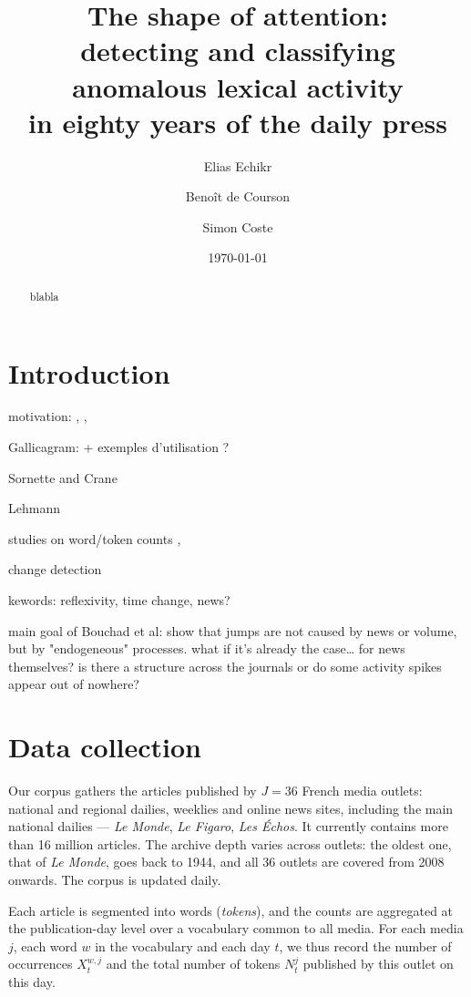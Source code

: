 \documentclass[11pt,a4paper]{article}
\title{The shape of attention:\\
detecting and classifying anomalous lexical activity\\
in eighty years of the daily press}
\author{%
  Elias Echikr \and
  Benoît de Courson \and
  Simon Coste
}
\date{\today}
\begin{document}
\maketitle

\begin{abstract}blabla
\end{abstract}

\tableofcontents

\newpage 


\section{Introduction}
 
motivation: \cite{cutler1988moves}, \cite{aubrun2025riding}, \cite{marcaccioli2022exogenous}

Gallicagram: \cite{azoulay2023gallicagram} + exemples d'utilisation ?

Sornette \cite{sornette2004endogenous} and Crane \cite{crane2008robust}

Lehmann \cite{lehmann2012dynamical}

studies on word/token counts \cite{katz1996distribution}, \cite{michel2011quantitative}

change detection \cite{kulkarni2015statistically,hamilton2016diachronic}

kewords: reflexivity, time change, news?

main goal of Bouchad et al: show that jumps are not caused by news or volume, but by "endogeneous"  processes. what if it's already the case… for news themselves? 
is there a structure across the journals or do some activity spikes appear out of nowhere?

\section{Data collection}
\label{sec:data}

Our corpus gathers the articles published by $J = 36$ French media outlets: national and regional dailies, weeklies and online news sites, including the main national dailies --- \emph{Le Monde}, \emph{Le Figaro}, \emph{Les Échos}. It currently contains more than 16 million articles. The archive depth varies across outlets: the oldest one, that of \emph{Le Monde}, goes back to 1944, and all 36 outlets are covered from 2008 onwards. The corpus is updated daily.

Each article is segmented into words (\emph{tokens}), and the counts are aggregated at the publication-day level over a vocabulary common to all media. For each media $j$, each word $w$ in the vocabulary and each day $t$, we thus record the number of occurrences $X_t^{w,j}$ and the total number of tokens $N_t^j$ published by this outlet on this day.
\end{document}
